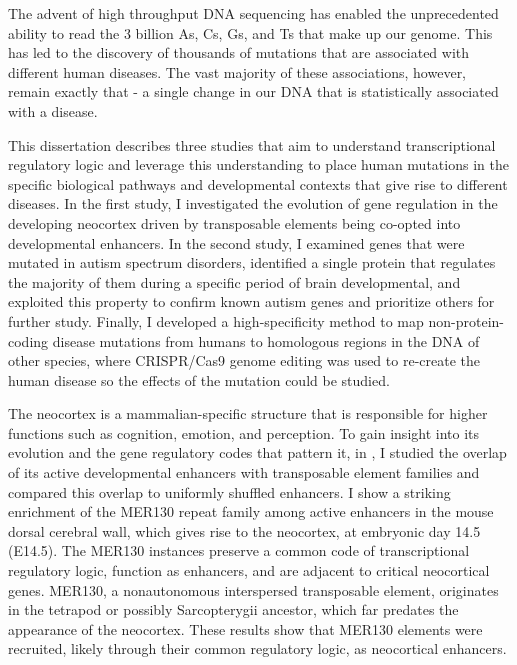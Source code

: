 The advent of high throughput DNA sequencing has enabled the unprecedented  ability to read the 3 billion As, Cs, Gs, and Ts that make up our genome. This has led to the discovery of thousands of mutations that are  associated with different human diseases. The vast majority of these associations, however, remain exactly that - a single change in our DNA that is statistically associated with a disease. 
%

This dissertation describes three studies that aim to understand transcriptional regulatory logic and leverage this understanding to place human mutations in the specific  biological pathways and developmental contexts that give rise to different diseases. In the first study, I investigated the evolution of gene regulation in the developing neocortex driven by transposable elements being co-opted into developmental enhancers. In the second study, I examined genes that were mutated in autism spectrum disorders, identified a single protein that regulates the majority of them during a specific period of brain developmental, and exploited this property to confirm known autism genes and prioritize others for further study. Finally, I developed a high-specificity method to map non-protein-coding disease mutations from humans to homologous regions in the DNA of other species, where CRISPR/Cas9 genome editing was used to re-create the human disease so the effects of the mutation could be studied.
%

The neocortex is a mammalian-specific structure that is responsible for higher functions such as cognition, emotion, and perception. To gain insight into its evolution and the gene regulatory codes that pattern it, in , I studied the overlap of its active developmental enhancers with transposable element families and compared this overlap to uniformly shuffled enhancers. I show a striking enrichment of the MER130 repeat family among active enhancers in the mouse dorsal cerebral wall, which gives rise to the neocortex, at embryonic day 14.5 (E14.5). The MER130 instances preserve a common code of transcriptional regulatory logic, function as enhancers, and are adjacent to critical neocortical genes. MER130, a nonautonomous interspersed transposable element, originates in the tetrapod or possibly Sarcopterygii ancestor, which far predates the appearance of the neocortex. These results show that MER130 elements were recruited, likely through their common regulatory logic, as neocortical enhancers.
%

